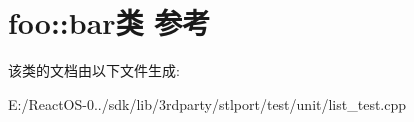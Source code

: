 \hypertarget{classfoo_1_1bar}{}\section{foo\+:\+:bar类 参考}
\label{classfoo_1_1bar}


该类的文档由以下文件生成\+:\begin{DoxyCompactItemize}
\item 
E\+:/\+React\+O\+S-\/0../sdk/lib/3rdparty/stlport/test/unit/list\+\_\+test.\+cpp\end{DoxyCompactItemize}
